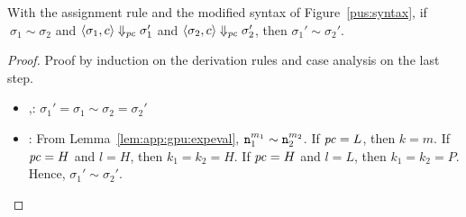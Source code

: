 \begin{myThm}
  With the assignment rule  and the modified syntax of
  Figure~\ref{pus:syntax}, if 
  $~\sigma_1 \sim \sigma_2$ and $\langle \sigma_1, c \rangle
  \Downarrow_{\mathit{pc}} \sigma_1' $ and $\langle \sigma_2, c
  \rangle\Downarrow_{\mathit{pc}} \sigma_2' $, then $\sigma_1' \sim
  \sigma_2'$.
\end{myThm}
\begin{proof} Proof by induction on the derivation rules and case
  analysis on the last step.
  \begin{itemize}
    \item {},: $\sigma_1' = \sigma_1 \sim \sigma_2 = \sigma_2'$ 
    \item {}: From Lemma~\ref{lem:app:gpu:expeval}, $\texttt{n}_1^{m_1} \sim
      \texttt{n}_2^{m_2}$. If $\mathit{pc} = L$, then $k = m$. If $\mathit{pc} = H$ and $l =
      H$, then $k_1 = k_2 = H$. If $\mathit{pc} = H$ and $l = L$, then $k_1 =
      k_2 = P$. Hence, $\sigma_1' \sim \sigma_2'$.


\end{itemize}
\end{proof}
